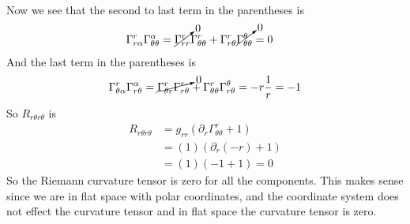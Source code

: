 \documentclass[11pt]{article}
\numberwithin{equation}{section}
\begin{document}
\begin{enumerate}[(a)]
\begin{align*}
\end{align*}
Now we see that the second to last term in the parentheses is
\begin{align*}
\Gamma^{r}_{r\alpha}\Gamma^{\alpha}_{\theta\theta} &= \cancelto{0}{\Gamma^{r}_{rr}}\Gamma^{r}_{\theta\theta} + \Gamma^{r}_{r\theta}\cancelto{0}{\Gamma^{\theta}_{\theta\theta}} = 0
\end{align*}
And the last term in the parentheses is 
$$\Gamma^{r}_{\theta\alpha}\Gamma^{\alpha}_{r\theta} = \cancelto{0}{\Gamma^{r}_{\theta r}\Gamma^{r}_{r\theta}} + \Gamma^{r}_{\theta\theta}\Gamma^{\theta}_{r\theta} = -r\frac{1}{r} = -1$$
So $R_{r\theta r\theta}$ is
\begin{align*}
R_{r\theta r\theta} &= g_{rr}\left(\partial_{r}\Gamma^{r}_{\theta\theta} + 1\right)\\
&= (1)\left(\partial_{r}(-r) + 1\right)\\
&= (1)\left(-1 + 1\right) = 0
\end{align*}
So the Riemann curvature tensor is zero for all the components. This makes sense since we are in flat space with polar coordinates, and the coordinate system does not effect the curvature tensor and in flat space the curvature tensor is zero.
\end{enumerate}
\end{document}
